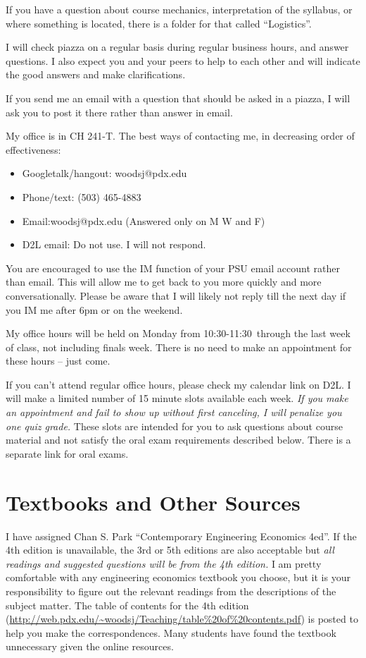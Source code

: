 \documentclass[letterpaper,10pt]{article}
\newcommand{\Office}{on Monday from 10:30-11:30}
\begin{document}
If you have a question about course mechanics, interpretation of the
syllabus, or where something is located, there is a folder for
that called ``Logistics''.

I will check piazza on a regular basis during regular business hours, and answer questions. I also expect you and your peers to help to each other and will indicate the good answers and make clarifications.  

If you send me an email with a question that should be asked in a piazza, I
will ask you to post it there rather than answer in email.


 
My office is in CH 241-T.  The best ways of contacting me, in
decreasing order of effectiveness:
\begin{itemize}
\item Googletalk/hangout: woodsj@pdx.edu
\item Phone/text: (503) 465-4883
\item Email:woodsj@pdx.edu (Answered only on M W and F)
\item D2L email: Do not use.  I will not respond.
\end{itemize}

You are encouraged to use the IM function of your PSU email account rather than email. This will allow me to get back to you more quickly and more conversationally. Please be aware that I will likely not reply till the next day if you IM me after 6pm or on the weekend.  

My office hours will be held \Office ~through the last week of class, not including finals week. There is no need to make an appointment for these hours -- just come.

If you can't attend regular office hours, please check my calendar link on D2L. I will make a limited number of 15 minute slots available each week. \emph{If you make an appointment and fail to show up without first canceling, I will penalize you one quiz grade.}  These slots are intended for you to ask questions about course material and not satisfy the oral exam requirements described below.  There is a separate link for oral exams.


\section{Textbooks and Other Sources}
I have assigned Chan S. Park ``Contemporary Engineering Economics
4ed''.  If the 4th edition is unavailable, the 3rd or 5th editions are also
acceptable but \emph{all readings and suggested questions will be from
  the 4th edition.} I am pretty comfortable with any engineering
economics textbook you choose, but it is your responsibility to figure
out the relevant readings from the descriptions of the subject matter.
The table of contents for the 4th edition (\url{http://web.pdx.edu/~woodsj/Teaching/table\%20of\%20contents.pdf}) is posted to help you
make the correspondences.  Many students have found the textbook unnecessary given the online resources.
\end{document}
